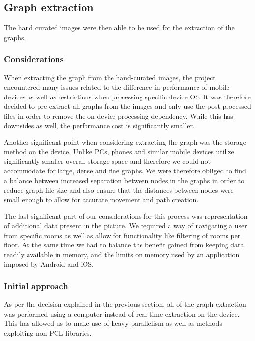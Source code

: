 \documentclass[main.tex]{subfiles}
\begin{document}
\subsection{Graph extraction}

The hand curated images were then able to be used for the extraction of the graphs.

\subsubsection{Considerations}

When extracting the graph from the hand-curated images, the project encountered many issues related to the difference in performance of mobile devices as well as restrictions when processing specific device OS. It was therefore decided to pre-extract all graphs from the images and only use the post processed files in order to remove the on-device processing dependency. While this has downsides as well, the performance cost is significantly smaller.
\newline
		
Another significant point when considering extracting the graph was the storage method on the device. Unlike PCs, phones and similar mobile devices utilize significantly smaller overall storage space and therefore we could not accommodate for large, dense and fine graphs. We were therefore obliged to find a balance between increased separation between nodes in the graphs in order to reduce graph file size and also ensure that the distances between nodes were small enough to allow for accurate movement and path creation.
\newline
	
The last significant part of our considerations for this process was representation of additional data present in the picture. We required a way of navigating a user from specific rooms as well as allow for functionality like filtering of rooms per floor. At the same time we had to balance the benefit gained from keeping data readily available in memory, and the limits on memory used by an application imposed by Android and iOS.

\subsubsection{Initial approach}

As per the decision explained in the previous section, all of the graph extraction was performed using a computer instead of real-time extraction on the device. This has allowed us to make use of heavy parallelism as well as methods exploiting non-PCL libraries.
\newline
	
\end{document}
